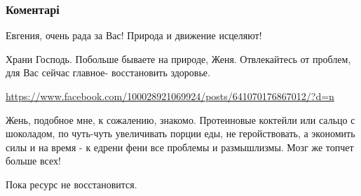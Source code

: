  
 
 
 
 
\subsubsection{Коментарі}
\label{sec:01_08_2021.fb.bilchenko_evgenia.1.nivki_park.cmt}

\begin{itemize}
 
Евгения, очень рада за Вас! Природа и движение исцеляют!

 
Храни Господь. Побольше бываете на природе, Женя. Отвлекайтесь от проблем, для Вас сейчас главное- восстановить здоровье.

 
\url{https://www.facebook.com/100028921069924/posts/641070176867012/?d=n}

 

Жень, подобное мне, к сожалению, знакомо. Протеиновые коктейли или сальцо с шоколадом,
по чуть-чуть увеличивать порции еды,
не геройствовать, а экономить силы
и на время - к едрени фени все проблемы и размышлизмы. Мозг же топчет больше всех!

Пока ресурс не восстановится.

\end{itemize}

